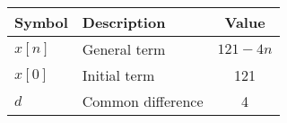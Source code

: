\begin{tabular}{|l|l|c|}
\hline
\textbf{Symbol} & \textbf{Description} & \textbf{Value} \\
\hline
$x[n]$ & General term & \(121 - 4n\) \\
\hline
$x[0]$ & Initial term & 121 \\
\hline
$d$ & Common difference & 4 \\
\hline
\end{tabular}
